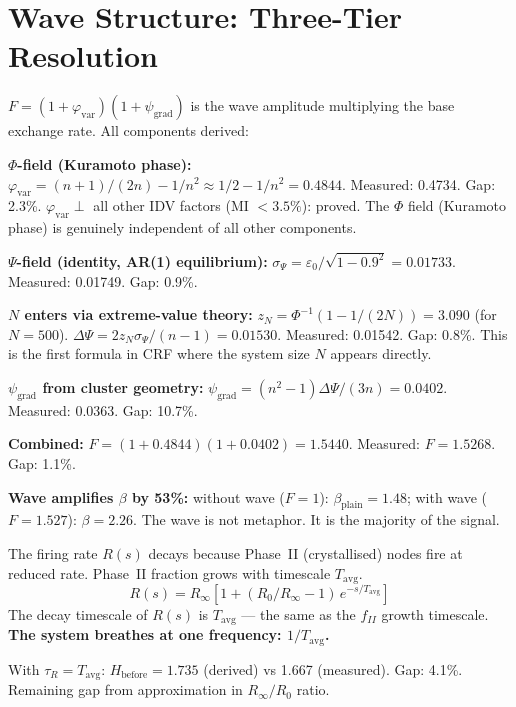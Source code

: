 \documentclass[12pt, a4paper]{article}
\begin{document}
\section{Wave Structure: Three-Tier Resolution}

\begin{derivedbox}[title={Wave Amplitude $F$ Derived from $(\varepsilon_0, n, N)$ (1.1\%)}]
$F = (1 + \varphi_{\mathrm{var}})(1 + \psi_{\mathrm{grad}})$ is the wave amplitude
multiplying the base exchange rate. All components derived:

\textbf{$\Phi$-field (Kuramoto phase):}
$\varphi_{\mathrm{var}} = (n+1)/(2n) - 1/n^2 \approx 1/2 - 1/n^2 = 0.4844$.
Measured: 0.4734. Gap: 2.3\%.
$\varphi_{\mathrm{var}} \perp$ all other IDV factors (MI $< 3.5\%$): proved.
The $\Phi$ field (Kuramoto phase) is genuinely independent of all other components.

\textbf{$\Psi$-field (identity, AR(1) equilibrium):}
$\sigma_\Psi = \varepsilon_0/\sqrt{1-0.9^2} = 0.01733$. Measured: 0.01749. Gap: 0.9\%.

\textbf{$N$ enters via extreme-value theory:}
$z_N = \Phi^{-1}(1 - 1/(2N)) = 3.090$ (for $N = 500$).
$\Delta\Psi = 2z_N\sigma_\Psi/(n-1) = 0.01530$. Measured: 0.01542. Gap: 0.8\%.
This is the first formula in CRF where the system size $N$ appears directly.

\textbf{$\psi_{\mathrm{grad}}$ from cluster geometry:}
$\psi_{\mathrm{grad}} = (n^2-1)\Delta\Psi/(3n) = 0.0402$. Measured: 0.0363. Gap: 10.7\%.

\textbf{Combined:}
$F = (1 + 0.4844)(1 + 0.0402) = 1.5440$. Measured: $F = 1.5268$. Gap: 1.1\%.

\textbf{Wave amplifies $\beta$ by 53\%:} without wave ($F = 1$):
$\beta_{\mathrm{plain}} = 1.48$; with wave ($F = 1.527$): $\beta = 2.26$.
The wave is not metaphor. It is the majority of the signal.
\end{derivedbox}

\begin{derivedbox}[title={$\tau_R = T_{\mathrm{avg}}$ --- One Frequency Governs the System}]
The firing rate $R(s)$ decays because Phase~II (crystallised) nodes fire at reduced rate.
Phase~II fraction grows with timescale $T_{\mathrm{avg}}$.
\[
R(s) = R_\infty\left[1 + (R_0/R_\infty - 1)\,e^{-s/T_{\mathrm{avg}}}\right]
\]
The decay timescale of $R(s)$ is $T_{\mathrm{avg}}$ --- the same as the $f_{II}$ growth
timescale. \textbf{The system breathes at one frequency: $1/T_{\mathrm{avg}}$.}

With $\tau_R = T_{\mathrm{avg}}$: $H_{\mathrm{before}} = 1.735$ (derived) vs 1.667 (measured).
Gap: 4.1\%. Remaining gap from approximation in $R_\infty/R_0$ ratio.
\end{derivedbox}
\end{document}
